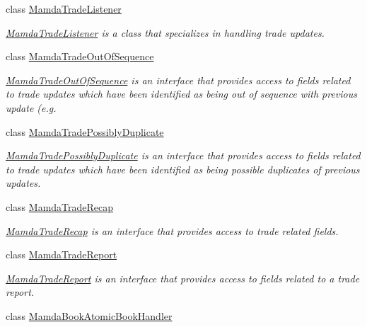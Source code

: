 \begin{CompactItemize}
class \hyperlink{classWombat_1_1MamdaTradeListener}{Mamda\-Trade\-Listener}
\begin{CompactList}\small\item\em \hyperlink{classWombat_1_1MamdaTradeListener}{Mamda\-Trade\-Listener} is a class that specializes in handling trade updates. \item\end{CompactList}\item 
class \hyperlink{classWombat_1_1MamdaTradeOutOfSequence}{Mamda\-Trade\-Out\-Of\-Sequence}
\begin{CompactList}\small\item\em \hyperlink{classWombat_1_1MamdaTradeOutOfSequence}{Mamda\-Trade\-Out\-Of\-Sequence} is an interface that provides access to fields related to trade updates which have been identified as being out of sequence with previous update (e.g. \item\end{CompactList}\item 
class \hyperlink{classWombat_1_1MamdaTradePossiblyDuplicate}{Mamda\-Trade\-Possibly\-Duplicate}
\begin{CompactList}\small\item\em \hyperlink{classWombat_1_1MamdaTradePossiblyDuplicate}{Mamda\-Trade\-Possibly\-Duplicate} is an interface that provides access to fields related to trade updates which have been identified as being possible duplicates of previous updates. \item\end{CompactList}\item 
class \hyperlink{classWombat_1_1MamdaTradeRecap}{Mamda\-Trade\-Recap}
\begin{CompactList}\small\item\em \hyperlink{classWombat_1_1MamdaTradeRecap}{Mamda\-Trade\-Recap} is an interface that provides access to trade related fields. \item\end{CompactList}\item 
class \hyperlink{classWombat_1_1MamdaTradeReport}{Mamda\-Trade\-Report}
\begin{CompactList}\small\item\em \hyperlink{classWombat_1_1MamdaTradeReport}{Mamda\-Trade\-Report} is an interface that provides access to fields related to a trade report. \item\end{CompactList}\item 
class \hyperlink{classWombat_1_1MamdaBookAtomicBookHandler}{Mamda\-Book\-Atomic\-Book\-Handler}

\end{CompactItemize}
